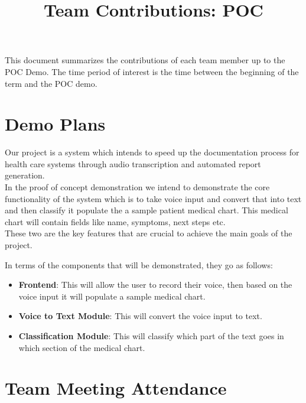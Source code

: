 \documentclass{article}
\title{Team Contributions: POC\\\progname}
\author{\authname}
\date{}
\begin{document}
\maketitle

This document summarizes the contributions of each team member up to the POC
Demo.  The time period of interest is the time between the beginning of the term
and the POC demo.

\section{Demo Plans}

Our project is a system which intends to speed up the documentation process for health care systems through audio transcription and automated report generation.\\
In the proof of concept demonstration we intend to demonstrate the core functionality of the system which is to take voice input and convert that into text and then classify it populate the a sample patient medical chart. This medical chart will contain fields like name, symptoms, next steps etc.\\
These two are the key features that are crucial to achieve the main goals of the project. 

In terms of the components that will be demonstrated, they go as follows:

\begin{itemize}
  \item \textbf{Frontend}: This will allow the user to record their voice, then based on the voice input it will populate a sample medical chart.
  \item \textbf{Voice to Text Module}: This will convert the voice input to text.
  \item \textbf{Classification Module}: This will classify which part of the text goes in which section of the medical chart.
\end{itemize}

\section{Team Meeting Attendance}

\end{document}
